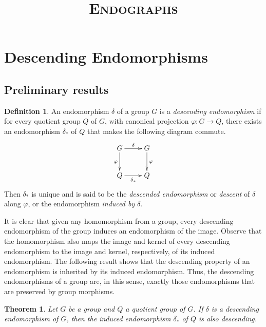 \documentclass[11pt, a4paper]{article}
\title{\scshape\bfseries Endographs}
\author{}
\newtheorem{Theorem}{Theorem}[section]
\theoremstyle{definition}
\newtheorem{Definition}{Definition}
\begin{document}
\maketitle

\section{Descending Endomorphisms}\label{sec:DescEnd}
\subsection{Preliminary results}\label{subsec:Prelims}

\begin{Definition}\label{def:DescEnd}
An endomorphism $\delta$ of a group $G$ is a \emph{descending endomorphism} if for every quotient group $Q$ of $G$, with canonical projection $\varphi \colon G \to Q$, there exists an endomorphism $\delta_*$ of $Q$ that makes the following diagram commute.
\begin{equation*}
\xymatrix{
	G \ar[r]^{\delta} \ar[d]_{\varphi} & G \ar[d]^{\varphi}\\
	Q \ar[r]_{\delta_*} & Q
}
\end{equation*}
Then $\delta_*$ is unique and is said to be the \emph{descended endomorphism} or \emph{descent} of $\delta$ along $\varphi$, or the endomorphism \emph{induced by} $\delta$.
\end{Definition}

It is clear that given any homomorphism from a group, every descending endomorphism of the group induces an endomorphism of the image. Observe that the homomorphism also maps the image and kernel of every descending endomorphism to the image and kernel, respectively, of its induced endomorphism. The following result shows that the descending property of an endomorphism is inherited by its induced endomorphism. Thus, the descending endomorphisms of a group are, in this sense, exactly those endomorphisms that are preserved by group morphisms.

\begin{Theorem}\label{thm:HerDescEnd}
Let $G$ be a group and $Q$ a quotient group of $G$. If $\delta$ is a descending endomorphism of $G$, then the induced endomorphism $\delta_*$ of $Q$ is also descending.
\end{Theorem}
\end{document}
